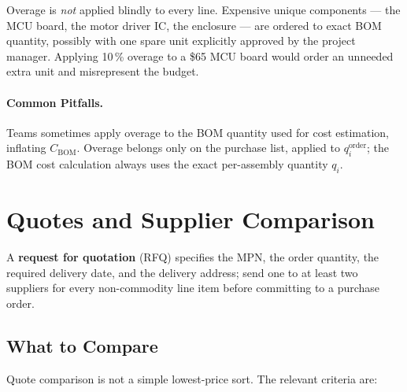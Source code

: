 Overage is \emph{not} applied blindly to every line.
Expensive unique components --- the MCU board, the motor driver IC, the
enclosure --- are ordered to exact BOM quantity, possibly with one spare unit
explicitly approved by the project manager.
Applying 10\,\% overage to a \$65 MCU board would order an unneeded extra unit
and misrepresent the budget.

\paragraph{Common Pitfalls.}
Teams sometimes apply overage to the BOM quantity used for cost estimation,
inflating $C_{\text{BOM}}$.
Overage belongs only on the purchase list, applied to $q_i^{\text{order}}$;
the BOM cost calculation always uses the exact per-assembly quantity $q_i$.

\section{Quotes and Supplier Comparison}
\label{sec:ch11-quotes}

A \textbf{request for quotation} (RFQ) specifies the MPN, the order quantity, the required delivery date, and the delivery address; send one to at least two suppliers for every non-commodity line item before committing to a purchase order.

\subsection{What to Compare}
\label{sec:ch11-quote-compare}

Quote comparison is not a simple lowest-price sort.
The relevant criteria are:

